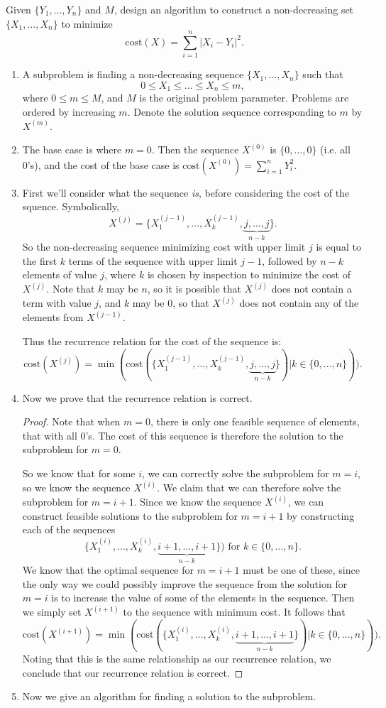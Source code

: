 \documentclass[11pt]{article}
\newcommand{\cost}{\textrm{cost}}
\begin{document}
Given $\{Y_1, \dots, Y_n\}$ and $M$, design an algorithm to construct a non-decreasing set $\{X_1, \dots, X_n\}$ to minimize 
\[\cost(X) = \sum_{i=1}^n |X_i-Y_i|^2.\]
\begin{enumerate}
\item A subproblem is finding a non-decreasing sequence $\{X_1, \dots, X_n\}$ such that \[0\leq X_1 \leq \dots\leq X_n \leq m,\] where $0 \leq m \leq M$, and $M$ is the original problem parameter. Problems are ordered by increasing $m$. Denote the solution sequence corresponding to $m$ by $X^{(m)}$.
\item The base case is where $m=0$. Then the sequence $X^{(0)}$ is $\{ 0, \dots, 0\}$ (i.e. all 0's), and the cost of the base case is $\cost(X^{(0)}) = \sum_{i=1}^n Y_i^2$. 
\item First we'll consider what the sequence \textit{is}, before considering the cost of the squence. Symbolically, 
\[ X^{(j)} = \{ X_1^{(j-1)}, \dots, X_k^{(j-1)}, \underbrace{j, \dots, j}_{n-k}\}. \]
So the non-decreasing sequence minimizing cost with upper limit $j$ is equal to the first $k$ terms of the sequence with upper limit $j-1$, followed by $n-k$ elements of value $j$, where $k$ is chosen by inspection to minimize the cost of $X^{(j)}$. Note that $k$ may be $n$, so it is possible that $X^{(j)}$ does not contain a term with value $j$, and $k$ may be $0$, so that $X^{(j)}$ does not contain any of the elements from $X^{(j-1)}$. 

Thus the recurrence relation for the cost of the sequence is:
\[ \cost(X^{(j)}) = \min(\cost(\{ X_1^{(j-1)}, \dots, X_k^{(j-1)}, \underbrace{j, \dots, j}_{n-k}\}) | k \in \{0, \dots, n\})).\]

\item Now we prove that the recurrence relation is correct. 
\begin{proof}
Note that when $m = 0$, there is only one feasible sequence of elements, that with all 0's. The cost of this sequence is therefore the solution to the subproblem for $m=0$.

So we know that for some $i$, we can correctly solve the subproblem for $m = i$, so we know the sequence $X^{(i)}$. We claim that we can therefore solve the subproblem for $m= i+1$. Since we know the sequence $X^{(i)}$, we can construct feasible solutions to the subproblem for $m = i+1$ by constructing each of the sequences 
\[ \{ X_1^{(i)}, \dots, X_k^{(i)}, \underbrace{i+1, \dots, i+1}_{n-k}\}) \textrm{ for } k \in \{0, \dots, n\} .\]
We know that the optimal sequence for $m = i+1$ must be one of these, since the only way we could possibly improve the sequence from the solution for $m=i$ is to increase the value of some of the elements in the sequence. Then we simply set $X^{(i+1)}$ to the sequence with minimum cost. It follows that 
\[ \cost(X^{(i+1)}) = \min(\cost(\{ X_1^{(i)}, \dots, X_k^{(i)}, \underbrace{i+1, \dots, i+1}_{n-k}\}) | k \in \{0, \dots, n\})).\]
Noting that this is the same relationship as our recurrence relation, we conclude that our recurrence relation is correct. 
\end{proof}
\item Now we give an algorithm for finding a solution to the subproblem. 


\end{enumerate}
\end{document}
